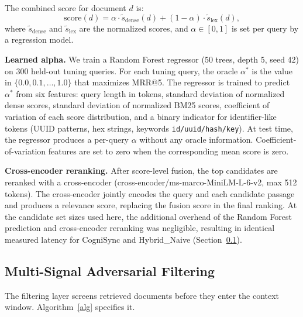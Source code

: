 \documentclass[sigconf]{acmart}
\begin{document}
The combined score for document $d$ is:
\begin{equation}
\mathrm{score}(d) = \alpha \cdot \tilde{s}_{\mathrm{dense}}(d) +
(1-\alpha) \cdot \tilde{s}_{\mathrm{lex}}(d),
\label{eq}
\end{equation}
where $\tilde{s}_{\mathrm{dense}}$ and $\tilde{s}_{\mathrm{lex}}$ are the
normalized scores, and $\alpha \in [0,1]$ is set per query by a regression
model.

\textbf{Learned alpha.} We train a Random Forest regressor (50 trees, depth
5, seed 42) on 300 held-out tuning queries. For each tuning query, the oracle
$\alpha^*$ is the value in $\{0.0, 0.1, \ldots, 1.0\}$ that maximizes MRR@5.
The regressor is trained to predict $\alpha^*$ from six features: query length
in tokens, standard deviation of normalized dense scores, standard deviation of
normalized BM25 scores, coefficient of variation of each score distribution,
and a binary indicator for identifier-like tokens (UUID patterns, hex strings,
keywords \texttt{id/uuid/hash/key}). At test time, the regressor produces a
per-query $\alpha$ without any oracle information. Coefficient-of-variation features are set to zero when the corresponding mean
score is zero.

\textbf{Cross-encoder reranking.} After score-level fusion, the top candidates
are reranked with a cross-encoder (cross-encoder/ms-marco-MiniLM-L-6-v2, max
512 tokens). The cross-encoder jointly encodes the query and each candidate
passage and produces a relevance score, replacing the fusion score in the final
ranking. At the candidate set sizes used here, the additional overhead of the Random Forest prediction and cross-encoder reranking was negligible, resulting in
identical measured latency for CogniSync and Hybrid_Naive
(Section~\ref{sec}).

\subsection{Multi-Signal Adversarial Filtering}
\label{sec}

The filtering layer screens retrieved documents before they enter the context
window. Algorithm~\ref{alg} specifies it.
\end{document}
